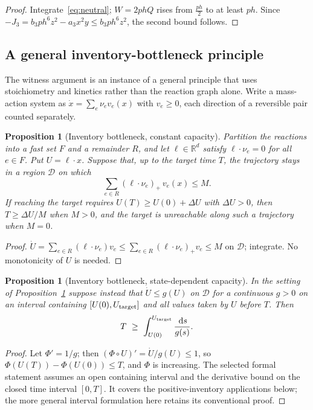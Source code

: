 \documentclass[11pt,a4paper]{article}
\theoremstyle{plain}
\newtheorem{proposition}[theorem]{Proposition}
\theoremstyle{definition}
\theoremstyle{remark}
\newcommand{\R}{\mathbb R}
\newcommand{\calD}{\mathcal D}
\newcommand{\dd}{\,\mathrm d}
\begin{document}
\begin{proof}
Integrate~\eqref{eq:neutral}; $W=2phQ$ rises from $\tfrac{ph}2$ to at least $ph$. Since $-J_3=b_3ph^6z^2-a_3x^2y\le b_3ph^6z^2$, the second bound follows.
\end{proof}

\subsection{A general inventory-bottleneck principle}
\label{sec:bottleneck}
The witness argument is an instance of a general principle that uses stoichiometry and kinetics rather than the reaction graph alone. Write a mass-action system as $\dot x=\sum_e\nu_ev_e(x)$ with $v_e\ge0$, each direction of a reversible pair counted separately.

\begin{proposition}[Inventory bottleneck, constant capacity]\label{prop:bottleneck}
Partition the reactions into a fast set $F$ and a remainder $R$, and let $\ell\in\R^d$ satisfy $\ell\cdot\nu_e=0$ for all $e\in F$. Put $U=\ell\cdot x$. Suppose that, up to the target time $T$, the trajectory stays in a region $\calD$ on which
\[
 \sum_{e\in R}(\ell\cdot\nu_e)_+\,v_e(x)\le M .
\]
If reaching the target requires $U(T)\ge U(0)+\Delta U$ with $\Delta U>0$, then $T\ge\Delta U/M$ when $M>0$, and the target is unreachable along such a trajectory when $M=0$.
\end{proposition}

\begin{proof}
$\dot U=\sum_{e\in R}(\ell\cdot\nu_e)v_e\le\sum_{e\in R}(\ell\cdot\nu_e)_+v_e\le M$ on $\calD$; integrate. No monotonicity of $U$ is needed.
\end{proof}

\begin{proposition}[Inventory bottleneck, state-dependent capacity]\label{prop:bottleneck-state}
In the setting of Proposition~\ref{prop:bottleneck} suppose instead that $\dot U\le g(U)$ on $\calD$ for a continuous $g>0$ on an interval containing $[U(0),U_{\rm target}]$ and all values taken by $U$ before $T$. Then
\begin{equation}\label{eq:state-capacity}
 T\ \ge\ \int_{U(0)}^{U_{\rm target}}\frac{\dd s}{g(s)} .
\end{equation}
\end{proposition}

\begin{proof}
Let $\Phi'=1/g$; then $(\Phi\circ U)'=\dot U/g(U)\le1$, so $\Phi(U(T))-\Phi(U(0))\le T$, and $\Phi$ is increasing. The selected formal statement assumes an open containing interval and the derivative bound on the closed time interval $[0,T]$. It covers the positive-inventory applications below; the more general interval formulation here retains its conventional proof.
\end{proof}
\end{document}
